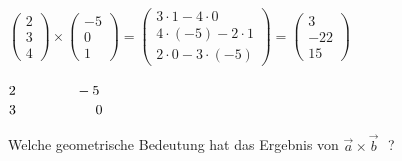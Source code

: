 \documentclass[paper=a6,landscape,ngerman,twoside=true,fontsize=12pt]{scrartcl}
\begin{document}
\begin{antwort}
	
	$\left(\begin{array}{c} 2 \\ 3 \\ 4\end{array} \right) \times \left(\begin{array}{c} -5 \\ 0 \\ 1\end{array} \right) =	\left(\begin{array}{c} 3 \cdot 1 - 4 \cdot 0 \\ 4 \cdot (-5) - 2 \cdot 1 \\ 2 \cdot 0 - 3 \cdot (-5)\end{array} \right)=\left(\begin{array}{c} 3 \\ -22 \\ 15\end{array} \right)$
	
	$2 \hspace{1.5cm}   -5\hspace{8.4cm}$
	$3 \hspace{2cm}   0\hspace{8.6cm}$
		
\end{antwort}	
\begin{frage}
	
	Welche geometrische Bedeutung hat das Ergebnis von $\vec{a}\times\vec{b}\textbf{ }$?
	
\end{frage}
\end{document}
